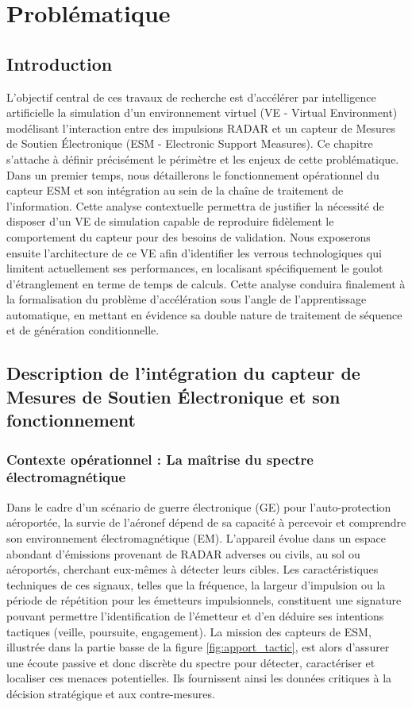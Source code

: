 \chapter{Problématique}
\label{chap:prob}
\section{Introduction}
L'objectif central de ces travaux de recherche est d'accélérer par intelligence artificielle la simulation d'un environnement virtuel (VE - Virtual Environment) modélisant l'interaction entre des impulsions RADAR et un capteur de Mesures de Soutien Électronique (ESM - Electronic Support Measures). Ce chapitre s'attache à définir précisément le périmètre et les enjeux de cette problématique. Dans un premier temps, nous détaillerons le fonctionnement opérationnel du capteur ESM et son intégration au sein de la chaîne de traitement de l'information. Cette analyse contextuelle permettra de justifier la nécessité de disposer d'un VE de simulation capable de reproduire fidèlement le comportement du capteur pour des besoins de validation. Nous exposerons ensuite l'architecture de ce VE afin d'identifier les verrous technologiques qui limitent actuellement ses performances, en localisant spécifiquement le goulot d'étranglement en terme de temps de calculs. Cette analyse conduira finalement à la formalisation du problème d'accélération sous l'angle de l'apprentissage automatique, en mettant en évidence sa double nature de traitement de séquence et de génération conditionnelle.
\section{Description de l'intégration du capteur de Mesures de Soutien Électronique et son fonctionnement}

\subsection{Contexte opérationnel : La maîtrise du spectre électromagnétique} 
Dans le cadre d'un scénario de guerre électronique (GE) pour l'auto-protection aéroportée, la survie de l'aéronef dépend de sa capacité à percevoir et comprendre son environnement électromagnétique (EM). L'appareil évolue dans un espace abondant d'émissions provenant de RADAR adverses ou civils, au sol ou aéroportés, cherchant eux-mêmes à détecter leurs cibles. Les caractéristiques techniques de ces signaux, telles que la fréquence, la largeur d'impulsion ou la période de répétition pour les émetteurs impulsionnels, constituent une signature pouvant permettre l'identification de l'émetteur et d'en déduire ses intentions tactiques (veille, poursuite, engagement). La mission des capteurs de ESM, illustrée dans la partie basse de la figure \ref{fig:apport_tactic}, est alors d'assurer une écoute passive et donc discrète du spectre pour détecter, caractériser et localiser ces menaces potentielles. Ils fournissent ainsi les données critiques à la décision stratégique et aux contre-mesures. 

